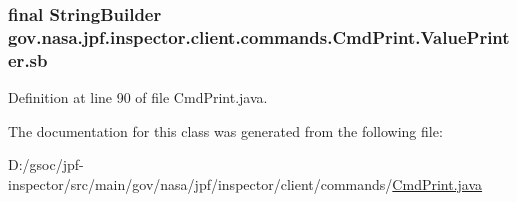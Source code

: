 \subsubsection[{\texorpdfstring{sb}{sb}}]{\setlength{\rightskip}{0pt plus 5cm}final String\+Builder gov.\+nasa.\+jpf.\+inspector.\+client.\+commands.\+Cmd\+Print.\+Value\+Printer.\+sb\hspace{0.3cm}{\ttfamily [private]}}\hypertarget{classgov_1_1nasa_1_1jpf_1_1inspector_1_1client_1_1commands_1_1_cmd_print_1_1_value_printer_a86eacdeab16acd6491038a0d80c57f62}{}\label{classgov_1_1nasa_1_1jpf_1_1inspector_1_1client_1_1commands_1_1_cmd_print_1_1_value_printer_a86eacdeab16acd6491038a0d80c57f62}


Definition at line 90 of file Cmd\+Print.\+java.



The documentation for this class was generated from the following file\+:\begin{DoxyCompactItemize}
\item 
D\+:/gsoc/jpf-\/inspector/src/main/gov/nasa/jpf/inspector/client/commands/\hyperlink{_cmd_print_8java}{Cmd\+Print.\+java}\end{DoxyCompactItemize}
